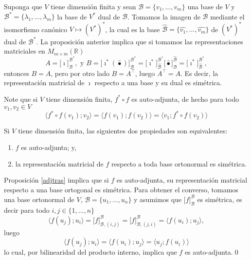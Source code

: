 \begin{obs}
Suponga que $V$ tiene dimensi\'on finita y sean $\mathcal{B}=\{v_1,\ldots,v_m\}$ una base de $V$ y $\mathcal{B}^*=\{\lambda_1,\ldots,\lambda_m\}$ la base de $V^*$ dual de $\mathcal{B}$. Tomamos la imagen de $\mathcal{B}$ mediante el isomorfismo can\'onico $V\mapsto \left(V^*\right)^*$, la cual es la base $\widehat{\mathcal{B}}=\{\widehat{v_1},\ldots,\widehat{v_m}\}$ de $\left(V^*\right)^*$ dual de $\mathcal{B}^*$. La proposici\'on anterior implica que si tomamos las representaciones matriciales en $M_{m\times m}(\mathbb{R})$
\[
A=\Big[\imath\Big]^{\mathcal{B}^*}_{\mathcal{B}},\textrm{ y } B=\Big[\imath^*(\widehat{\bullet})\Big]^{\mathcal{B}^*}_{\mathcal{B}}=\Big[\imath^*\Big]^{\mathcal{B}^*}_{\widehat{\mathcal{B}}}\Big[\widehat{\bullet}\Big]^{\widehat{\mathcal{B}}}_\mathcal{B}=\Big[\imath^*\Big]^{\mathcal{B}^*}_{\widehat{\mathcal{B}}}, 
\]
entonces $B=A$, pero por otro lado $B=A^\intercal$, luego $A^\intercal=A$.
Es decir, la representaci\'on matricial de $\imath$ respecto a una base y su dual es sim\'etrica.
\end{obs}

\begin{obs}
Note que si $V$ tiene dimensi\'on finita, $f^*\circ f$ es auto-adjunta, de hecho para todo $v_1,v_2\in V$
\[
\langle f^*\circ f(v_1);v_2\rangle=\langle f(v_1);f(v_2)\rangle=\langle v_1;f^*\circ f(v_2)\rangle
\]
\end{obs}

\begin{prop}
Si $V$ tiene dimensi\'on finita, las siguientes dos propiedades son equivalentes:
\begin{enumerate}
\item $f$ es auto-adjunta; y,
\item la representaci\'on matricial de $f$ respecto a toda base ortonormal es sim\'etrica.
\end{enumerate}
\end{prop}

\dem Proposici\'on \ref{adjtras} implica que si $f$ es auto-adjunta, su representaci\'on matricial respecto a una base ortogonal es sim\'etrica. Para obtener el converso, tomamos una base ortonormal de $V$, $\mathcal{B}=\{u_1,\ldots,u_n\}$ y asumimos que $\Big[f\Big]^\mathcal{B}_\mathcal{B}$ es sim\'etrica, es decir para todo $i,j\in\{1,\ldots,n\}$
\[
\langle f(u_j);u_i \rangle= \Big[f\Big]^\mathcal{B}_{\mathcal{B},(i,j)}= \Big[f\Big]^\mathcal{B}_{\mathcal{B},(j,i)}= \langle f(u_i);u_j \rangle,
\]
luego
\[
\langle f(u_j);u_i \rangle=\langle f(u_i);u_j \rangle=\langle u_j;f(u_i) \rangle
\]
lo cual, por bilinearidad del producto interno, implica que $f$ es auto-adjunta.\qed


